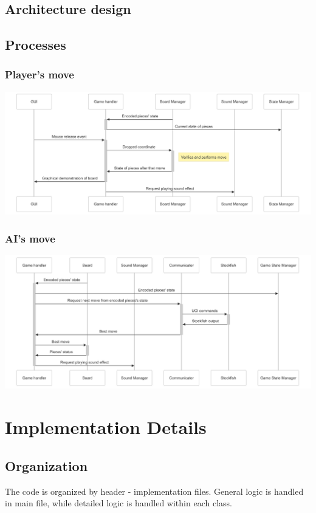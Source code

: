 \documentclass[a4paper, 10pt, titlepage]{report}
\begin{document}
\section{Architecture design}


\section{Processes}
\subsection{Player's move}
\includegraphics[width = \linewidth]{MOve diagram.png}
\subsection{AI's move}
\includegraphics[width = \linewidth]{AI move.png}

\chapter{Implementation Details}
\section{Organization}
The code is organized by header - implementation files. General logic is handled in main file, while detailed logic is handled within each class.
\end{document}
